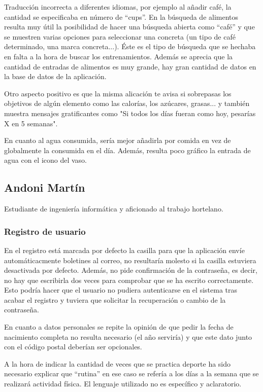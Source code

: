 \documentclass[a4paper]{article}
\begin{document}
			Traducción incorrecta a diferentes idiomas, por ejemplo al añadir café, la cantidad se especificaba en número de ``cups''. En la búsqueda de alimentos resulta muy útil la posibilidad de hacer una búsqueda abierta como ``café'' y que se muestren varias opciones para seleccionar una concreta (un tipo de café determinado, una marca concreta...). Éste es el tipo de búsqueda que se hechaba en falta a la hora de buscar los entrenamientos. Además se aprecia que la cantidad de entradas de alimentos es muy grande, hay gran cantidad de datos en la base de datos de la aplicación.
			
			Otro aspecto positivo es que la misma alicación te avisa si sobrepasas los objetivos de algún elemento como las calorías, los azúcares, grasas... y también muestra mensajes gratificantes como "Si todos los días fueran como hoy, pesarías X en 5 semanas".
			
			En cuanto al agua consumida, sería mejor añadirla por comida en vez de globalmente la consumida en el día. Además, resulta poco gráfico la entrada de agua con el icono del vaso.
			
			
		\FloatBarrier
		
		\subsection{Andoni Martín}
		
			Estudiante de ingeniería informática y aficionado al trabajo hortelano.
		
			\subsubsection*{Registro de usuario}
			
			En el registro está marcada por defecto la casilla para que la aplicación envíe automáticacmente boletines al correo, no resultaría molesto si la casilla estuviera desactivada por defecto. Además, no pide confirmación de la contraseña, es decir, no hay que escribirla dos veces para comprobar que se ha escrito correctamente. Esto podría hacer que el usuario no pudiera autenticarse en el sistema tras acabar el registro y tuviera que solicitar la recuperación o cambio de la contraseña.
			
			En cuanto a datos personales se repite la opinión de que pedir la fecha de nacimiento completa no resulta necesario (el año serviría) y que este dato junto con el código postal deberían ser opcionales.
			
			A la hora de indicar la cantidad de veces que se practica deporte ha sido necesario explicar que ``rutina'' en ese caso se refería a los días a la semana que se realizará actividad física. El lenguaje utilizado no es específico y aclaratorio.
			
\end{document}
